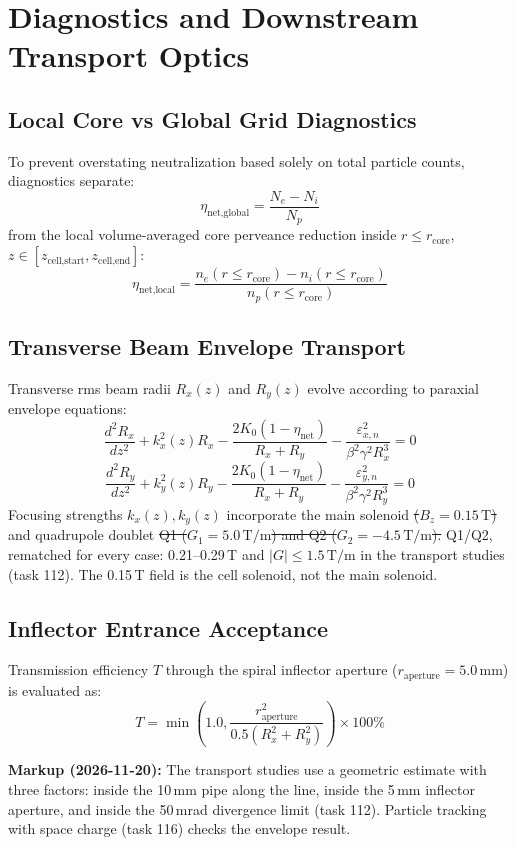 \documentclass[11pt,a4paper]{article}
\newcommand{\old}[1]{\textcolor{red!70!black}{\sout{#1}}}
\newcommand{\new}[1]{\textcolor{blue!60!black}{#1}}
\newcommand{\revnote}[1]{\begin{tcolorbox}[colback=yellow!8,colframe=orange!70!black,boxrule=0.5pt,left=4pt,right=4pt,top=2pt,bottom=2pt]\small\textbf{Markup (2026-11-20):} #1\end{tcolorbox}}
\begin{document}
\section{Diagnostics and Downstream Transport Optics}

\subsection{Local Core vs Global Grid Diagnostics}
To prevent overstating neutralization based solely on total particle counts, diagnostics separate:
\begin{equation}
\eta_{\text{net,global}} = \frac{N_e - N_i}{N_p}
\end{equation}
from the local volume-averaged core perveance reduction inside $r \le r_{\text{core}}$, $z \in [z_{\text{cell,start}}, z_{\text{cell,end}}]$:
\begin{equation}
\eta_{\text{net,local}} = \frac{n_e(r \le r_{\text{core}}) - n_i(r \le r_{\text{core}})}{n_p(r \le r_{\text{core}})}
\end{equation}

\subsection{Transverse Beam Envelope Transport}
Transverse rms beam radii $R_x(z)$ and $R_y(z)$ evolve according to paraxial envelope equations:
\begin{equation}
\frac{d^2 R_x}{dz^2} + k_x^2(z) R_x - \frac{2 K_0 (1 - \eta_{\text{net}})}{R_x + R_y} - \frac{\varepsilon_{x,n}^2}{\beta^2 \gamma^2 R_x^3} = 0
\end{equation}
\begin{equation}
\frac{d^2 R_y}{dz^2} + k_y^2(z) R_y - \frac{2 K_0 (1 - \eta_{\text{net}})}{R_x + R_y} - \frac{\varepsilon_{y,n}^2}{\beta^2 \gamma^2 R_y^3} = 0
\end{equation}
Focusing strengths $k_x(z), k_y(z)$ incorporate the main solenoid \old{($B_z = 0.15\,\text{T}$)} and quadrupole doublet \old{Q1 ($G_1 = 5.0\,\text{T/m}$) and Q2 ($G_2 = -4.5\,\text{T/m}$).} \new{Q1/Q2, rematched for every case: 0.21--0.29\,T and $|G| \le 1.5\,\text{T/m}$ in the transport studies (task 112). The 0.15\,T field is the cell solenoid, not the main solenoid.}

\subsection{Inflector Entrance Acceptance}
Transmission efficiency $T$ through the spiral inflector aperture ($r_{\text{aperture}} = 5.0\,\text{mm}$) is evaluated as:
\begin{equation}
T = \min\left( 1.0, \frac{r_{\text{aperture}}^2}{0.5(R_x^2 + R_y^2)} \right) \times 100\%
\end{equation}
\revnote{The transport studies use a geometric estimate with three factors: inside the 10\,mm pipe
along the line, inside the 5\,mm inflector aperture, and inside the 50\,mrad divergence limit
(task 112). Particle tracking with space charge (task 116) checks the envelope result.}
\end{document}
